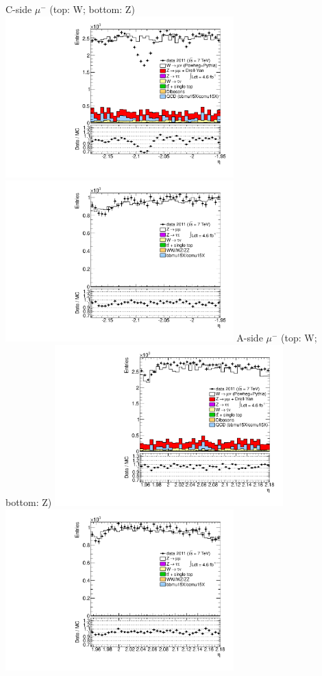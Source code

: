  {
\colb[T]
C-side $\mu^{-}$ (top: W; bottom: Z)
\centering
\includegraphics[width=0.66\textwidth]{dates/20130306/figures/avgmu/Wavgmu11_10_C_stack_l_eta_NEG} \\
\includegraphics[width=0.66\textwidth]{dates/20130306/figures/both/Z_10_C_stack_lN_eta_ALL.pdf}
A-side $\mu^{-}$ (top: W; bottom: Z)
\centering
\includegraphics[width=0.66\textwidth]{dates/20130306/figures/avgmu/Wavgmu11_10_A_stack_l_eta_NEG} \\
\includegraphics[width=0.66\textwidth]{dates/20130306/figures/both/Z_10_A_stack_lN_eta_ALL.pdf} 
\cole
}

